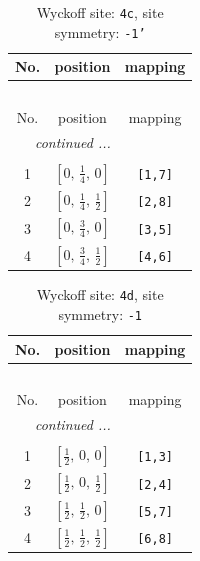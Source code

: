 \documentclass[fleqn,8pt]{jsarticle}
\begin{document}
\renewcommand{\arraystretch}{1.2}
\begin{longtable}{ccc}
\caption{Wyckoff site: {\tt 4c}, site symmetry: {\tt -1'}}
 \\
 \hline \hline
No. & position & mapping \\ \hline \endfirsthead

\multicolumn{2}{l}{\tablename\ \thetable{}} \\
 \hline \hline
No. & position & mapping \\ \hline \endhead

 \hline \hline
\multicolumn{2}{r}{\footnotesize\it continued ...} \\ \endfoot

 \hline \hline
\multicolumn{2}{r}{} \\ \endlastfoot

1 & $\left[ 0,\, \frac{1}{4},\, 0 \right]$ & {\tt [1,7]} \\ \hline
2 & $\left[ 0,\, \frac{1}{4},\, \frac{1}{2} \right]$ & {\tt [2,8]} \\ \hline
3 & $\left[ 0,\, \frac{3}{4},\, 0 \right]$ & {\tt [3,5]} \\ \hline
4 & $\left[ 0,\, \frac{3}{4},\, \frac{1}{2} \right]$ & {\tt [4,6]} \\
\end{longtable}
\renewcommand{\arraystretch}{1.2}
\begin{longtable}{ccc}
\caption{Wyckoff site: {\tt 4d}, site symmetry: {\tt -1}}
 \\
 \hline \hline
No. & position & mapping \\ \hline \endfirsthead

\multicolumn{2}{l}{\tablename\ \thetable{}} \\
 \hline \hline
No. & position & mapping \\ \hline \endhead

 \hline \hline
\multicolumn{2}{r}{\footnotesize\it continued ...} \\ \endfoot

 \hline \hline
\multicolumn{2}{r}{} \\ \endlastfoot

1 & $\left[ \frac{1}{2},\, 0,\, 0 \right]$ & {\tt [1,3]} \\ \hline
2 & $\left[ \frac{1}{2},\, 0,\, \frac{1}{2} \right]$ & {\tt [2,4]} \\ \hline
3 & $\left[ \frac{1}{2},\, \frac{1}{2},\, 0 \right]$ & {\tt [5,7]} \\ \hline
4 & $\left[ \frac{1}{2},\, \frac{1}{2},\, \frac{1}{2} \right]$ & {\tt [6,8]} \\
\end{longtable}
\end{document}
